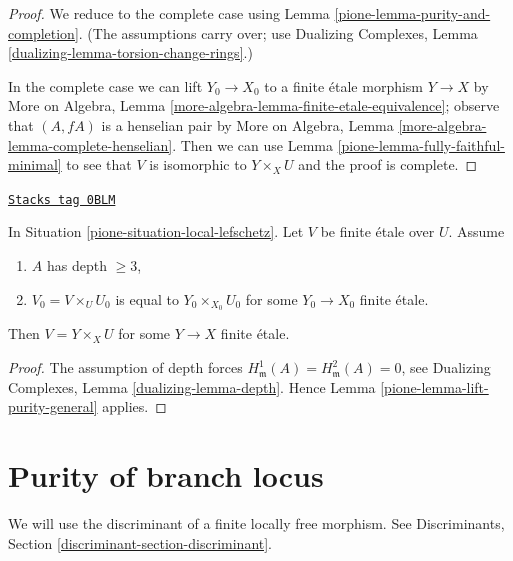 \begin{proof}

We reduce to the complete case using Lemma \ref{pione-lemma-purity-and-completion}.
(The assumptions carry over; use Dualizing Complexes, Lemma
\ref{dualizing-lemma-torsion-change-rings}.)

\medskip\noindent
In the complete case we can lift $Y_0 \to X_0$ to a finite \'etale
morphism $Y \to X$ by
More on Algebra, Lemma \ref{more-algebra-lemma-finite-etale-equivalence};
observe that $(A, fA)$ is a henselian pair by
More on Algebra, Lemma \ref{more-algebra-lemma-complete-henselian}.
Then we can use Lemma \ref{pione-lemma-fully-faithful-minimal}
to see that $V$ is isomorphic to $Y \times_X U$ and
the proof is complete.
\end{proof}

\begin{lemma}
\label{pione-lemma-lift-purity}
\href{https://stacks.math.columbia.edu/tag/0BLM}{\texttt{Stacks tag 0BLM}}

In Situation \ref{pione-situation-local-lefschetz}.
Let $V$ be finite \'etale over $U$. Assume
\begin{enumerate}
\item $A$ has depth $\geq 3$,
\item $V_0 = V \times_U U_0$ is equal to $Y_0 \times_{X_0} U_0$
for some $Y_0 \to X_0$ finite \'etale.
\end{enumerate}
Then $V = Y \times_X U$ for some $Y \to X$ finite \'etale.
\end{lemma}

\begin{proof}

The assumption of depth forces
$H^1_\mathfrak m(A) = H^2_\mathfrak m(A) = 0$, see
Dualizing Complexes, Lemma \ref{dualizing-lemma-depth}.
Hence Lemma \ref{pione-lemma-lift-purity-general} applies.
\end{proof}

\section{Purity of branch locus}
\label{pione-section-purity}
We will use the discriminant of a finite locally free morphism. See
Discriminants, Section \ref{discriminant-section-discriminant}.

